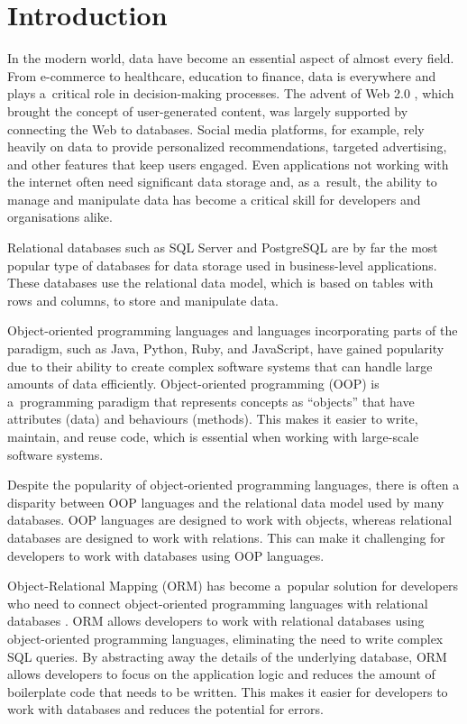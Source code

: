 \chapter{Introduction}

In the modern world, data have become an essential aspect of almost every field.
From e-commerce to healthcare, education to finance, data is everywhere and
plays a~critical role in decision-making processes. The advent of Web 2.0
\cite{Web2Oreilly}, which brought the concept of user-generated content, was
largely supported by connecting the Web to databases. Social media platforms,
for example, rely heavily on data to provide personalized recommendations,
targeted advertising, and other features that keep users engaged. Even
applications not working with the internet often need significant data storage
and, as a~result, the ability to manage and manipulate data has become a
critical skill for developers and organisations alike.

Relational databases such as SQL Server and PostgreSQL are by far the most
popular type of databases for data storage used in business-level applications.
These databases use the relational data model, which is based on tables with
rows and columns, to store and manipulate data.

Object-oriented programming languages and languages incorporating parts of the
paradigm, such as Java, Python, Ruby, and JavaScript, have gained
popularity \cite{stack-overflow-survey} due to their ability to create complex
software systems that can handle large amounts of data efficiently.
Object-oriented programming (OOP) is a~programming paradigm that represents
concepts as \enquote{objects} that have attributes (data) and behaviours
(methods). This makes it easier to write, maintain, and reuse code, which is
essential when working with large-scale software systems.

\newpage

Despite the popularity of object-oriented programming languages, there is often
a disparity between OOP languages and the relational data model used by many
databases. OOP languages are designed to work with objects, whereas relational
databases are designed to work with relations. This can make it challenging for
developers to work with databases using OOP languages. 

Object-Relational Mapping (ORM) has become a~popular solution for developers who
need to connect object-oriented programming languages with relational databases
\cite{Torres_Galante_Pimenta_Martins_2017}. ORM allows developers to work with
relational databases using object-oriented programming languages, eliminating
the need to write complex SQL queries. By abstracting away the details of the
underlying database, ORM allows developers to focus on the application logic and
reduces the amount of boilerplate code that needs to be written. This makes it
easier for developers to work with databases and reduces the potential for
errors. 

